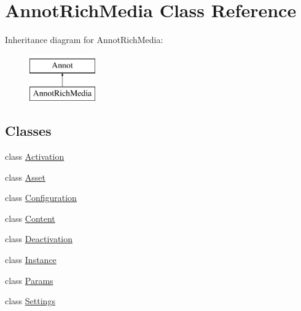\hypertarget{class_annot_rich_media}{}\section{Annot\+Rich\+Media Class Reference}
\label{class_annot_rich_media}
Inheritance diagram for Annot\+Rich\+Media\+:\begin{figure}[H]
\begin{center}
\leavevmode
\includegraphics[height=2.000000cm]{class_annot_rich_media}
\end{center}
\end{figure}
\subsection*{Classes}
\begin{DoxyCompactItemize}
\item 
class \hyperlink{class_annot_rich_media_1_1_activation}{Activation}
\item 
class \hyperlink{class_annot_rich_media_1_1_asset}{Asset}
\item 
class \hyperlink{class_annot_rich_media_1_1_configuration}{Configuration}
\item 
class \hyperlink{class_annot_rich_media_1_1_content}{Content}
\item 
class \hyperlink{class_annot_rich_media_1_1_deactivation}{Deactivation}
\item 
class \hyperlink{class_annot_rich_media_1_1_instance}{Instance}
\item 
class \hyperlink{class_annot_rich_media_1_1_params}{Params}
\item 
class \hyperlink{class_annot_rich_media_1_1_settings}{Settings}
\end{DoxyCompactItemize}
